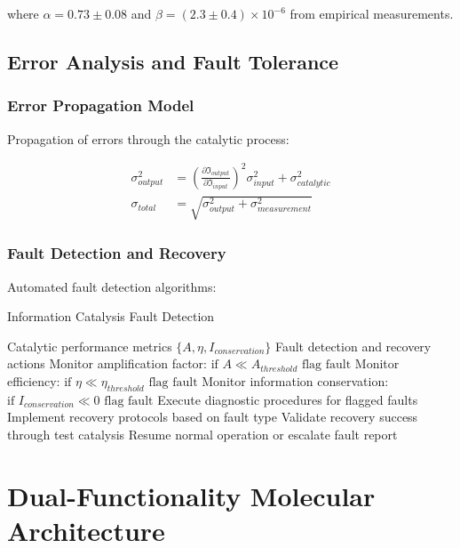 \documentclass[12pt,a4paper]{article}
\begin{document}
where $\alpha = 0.73 \pm 0.08$ and $\beta = (2.3 \pm 0.4) \times 10^{-6}$ from empirical measurements.

\subsection{Error Analysis and Fault Tolerance}

\subsubsection{Error Propagation Model}

Propagation of errors through the catalytic process:

\begin{align}
\sigma^2_{output} &= \left(\frac{\partial \mathfrak{I}_{output}}{\partial \mathfrak{I}_{input}}\right)^2 \sigma^2_{input} + \sigma^2_{catalytic} \\
\sigma_{total} &= \sqrt{\sigma^2_{output} + \sigma^2_{measurement}}
\end{align}

\subsubsection{Fault Detection and Recovery}

Automated fault detection algorithms:

\begin{algorithm}[H]
\caption{Information Catalysis Fault Detection}
\begin{algorithmic}[1]
\REQUIRE Catalytic performance metrics $\{A, \eta, I_{conservation}\}$
\ENSURE Fault detection and recovery actions
\STATE Monitor amplification factor: $\text{if } A \ll A_{threshold} \text{ flag fault}$
\STATE Monitor efficiency: $\text{if } \eta \ll \eta_{threshold} \text{ flag fault}$  
\STATE Monitor information conservation: $\text{if } I_{conservation} \ll 0 \text{ flag fault}$
\STATE Execute diagnostic procedures for flagged faults
\STATE Implement recovery protocols based on fault type
\STATE Validate recovery success through test catalysis
\STATE Resume normal operation or escalate fault report
\end{algorithmic}
\end{algorithm}

\section{Dual-Functionality Molecular Architecture}
\end{document}
